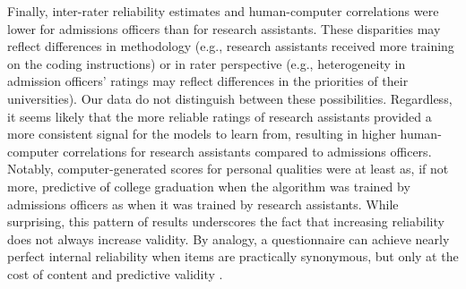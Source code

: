 \documentclass[11pt]{report}
\begin{document}
\begin{mainf}
Finally, inter-rater reliability estimates and human-computer correlations were lower for admissions officers than for research assistants. These disparities may reflect differences in methodology (e.g., research assistants received more training on the coding instructions) or in rater perspective (e.g., heterogeneity in admission officers' ratings may reflect differences in the priorities of their universities). Our data do not distinguish between these possibilities. Regardless, it seems likely that the more reliable ratings of research assistants provided a more consistent signal for the models to learn from, resulting in higher human-computer correlations for research assistants compared to admissions officers. Notably, computer-generated scores for personal qualities were at least as, if not more, predictive of college graduation when the algorithm was trained by admissions officers as when it was trained by research assistants. While surprising, this pattern of results underscores the fact that increasing reliability does not always increase validity. By analogy, a questionnaire can achieve nearly perfect internal reliability when items are practically synonymous, but only at the cost of content and predictive validity \cite{clifton_managing_2020}. 



\end{mainf}
\end{document}
